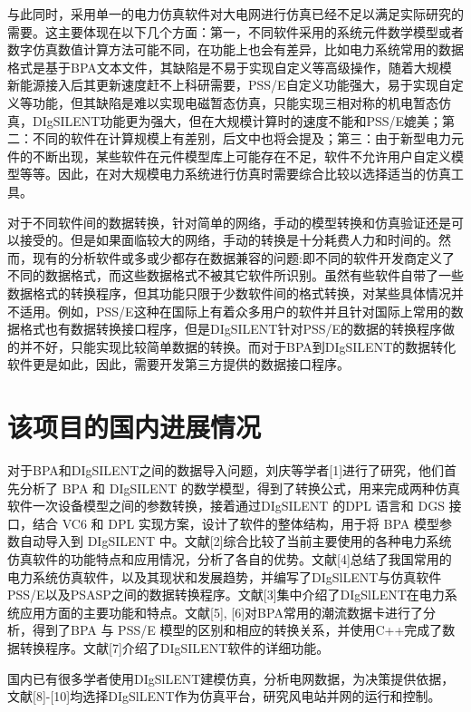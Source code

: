 与此同时，采用单一的电力仿真软件对大电网进行仿真已经不足以满足实际研究的需要。这主要体现在以下几个方面：第一，不同软件采用的系统元件数学模型或者数字仿真数值计算方法可能不同，在功能上也会有差异，比如电力系统常用的数据格式是基于BPA文本文件，其缺陷是不易于实现自定义等高级操作，随着大规模新能源接入后其更新速度赶不上科研需要，PSS/E自定义功能强大，易于实现自定义等功能，但其缺陷是难以实现电磁暂态仿真，只能实现三相对称的机电暂态仿真，DIgSILENT功能更为强大，但在大规模计算时的速度不能和PSS/E媲美；第二：不同的软件在计算规模上有差别，后文中也将会提及；第三：由于新型电力元件的不断出现，某些软件在元件模型库上可能存在不足，软件不允许用户自定义模型等等。因此，在对大规模电力系统进行仿真时需要综合比较以选择适当的仿真工具。

对于不同软件间的数据转换，针对简单的网络，手动的模型转换和仿真验证还是可以接受的。但是如果面临较大的网络，手动的转换是十分耗费人力和时间的。然而，现有的分析软件或多或少都存在数据兼容的问题:即不同的软件开发商定义了不同的数据格式，而这些数据格式不被其它软件所识别。虽然有些软件自带了一些数据格式的转换程序，但其功能只限于少数软件间的格式转换，对某些具体情况并不适用。例如，PSS/E这种在国际上有着众多用户的软件并且针对国际上常用的数据格式也有数据转换接口程序，但是DIgSILENT针对PSS/E的数据的转换程序做的并不好，只能实现比较简单数据的转换。而对于BPA到DIgSILENT的数据转化软件更是如此，因此，需要开发第三方提供的数据接口程序。

\section{该项目的国内进展情况}

对于BPA和DIgSILENT之间的数据导入问题，刘庆等学者[1]进行了研究，他们首先分析了 BPA 和 DIgSILENT 的数学模型，得到了转换公式，用来完成两种仿真软件一次设备模型之间的参数转换，接着通过DIgSILENT 的DPL 语言和 DGS 接口，结合 VC6 和 DPL 实现方案，设计了软件的整体结构，用于将 BPA 模型参数自动导入到 DIgSILENT 中。文献[2]综合比较了当前主要使用的各种电力系统仿真软件的功能特点和应用情况，分析了各自的优势。文献[4]总结了我国常用的电力系统仿真软件，以及其现状和发展趋势，并编写了DIgSlLENT与仿真软件PSS/E以及PSASP之间的数据转换程序。文献[3]集中介绍了DIgSlLENT在电力系统应用方面的主要功能和特点。文献[5], [6]对BPA常用的潮流数据卡进行了分
析，得到了BPA 与 PSS/E 模型的区别和相应的转换关系，并使用C++完成了数据转换程序。文献[7]介绍了DIgSILENT软件的详细功能。

国内已有很多学者使用DIgSlLENT建模仿真，分析电网数据，为决策提供依据，文献[8]-[10]均选择DIgSlLENT作为仿真平台，研究风电站并网的运行和控制。

